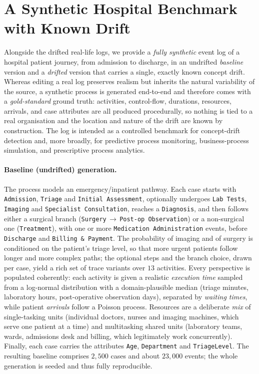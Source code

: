 \section{A Synthetic Hospital Benchmark with Known Drift}
\label{sec:synthetic-hospital}

Alongside the drifted real-life logs, we provide a \emph{fully synthetic} event log of a hospital patient
journey, from admission to discharge, in an undrifted \emph{baseline} version and a \emph{drifted} version
that carries a single, exactly known concept drift. Whereas editing a real log preserves realism but inherits
the natural variability of the source, a synthetic process is generated end-to-end and therefore comes with a
\emph{gold-standard} ground truth: activities, control-flow, durations, resources, arrivals, and case
attributes are all produced procedurally, so nothing is tied to a real organisation and the location and
nature of the drift are known by construction. The log is intended as a controlled benchmark for
concept-drift detection and, more broadly, for predictive process monitoring, business-process simulation,
and prescriptive process analytics.

\paragraph{Baseline (undrifted) generation.}
The process models an emergency/inpatient pathway. Each case starts with \texttt{Admission}, \texttt{Triage}
and \texttt{Initial Assessment}, optionally undergoes \texttt{Lab Tests}, \texttt{Imaging} and
\texttt{Specialist Consultation}, reaches a \texttt{Diagnosis}, and then follows either a surgical branch
(\texttt{Surgery}\,$\rightarrow$\,\texttt{Post-op Observation}) or a non-surgical one (\texttt{Treatment}),
with one or more \texttt{Medication Administration} events, before \texttt{Discharge} and
\texttt{Billing~\&~Payment}. The probability of imaging and of surgery is conditioned on the patient's
triage level, so that more urgent patients follow longer and more complex paths; the optional steps and the
branch choice, drawn per case, yield a rich set of trace variants over $13$ activities. Every perspective is
populated coherently: each activity is given a realistic \emph{execution time} sampled from a log-normal
distribution with a domain-plausible median (triage minutes, laboratory hours, post-operative observation
days), separated by \emph{waiting times}, while patient \emph{arrivals} follow a Poisson process. Resources
are a deliberate \emph{mix} of single-tasking units (individual doctors, nurses and imaging machines, which
serve one patient at a time) and multitasking shared units (laboratory teams, wards, admissions desk and
billing, which legitimately work concurrently). Finally, each case carries the attributes \texttt{Age},
\texttt{Department} and \texttt{TriageLevel}. The resulting baseline comprises $2{,}500$ cases and about
$23{,}000$ events; the whole generation is seeded and thus fully reproducible.

